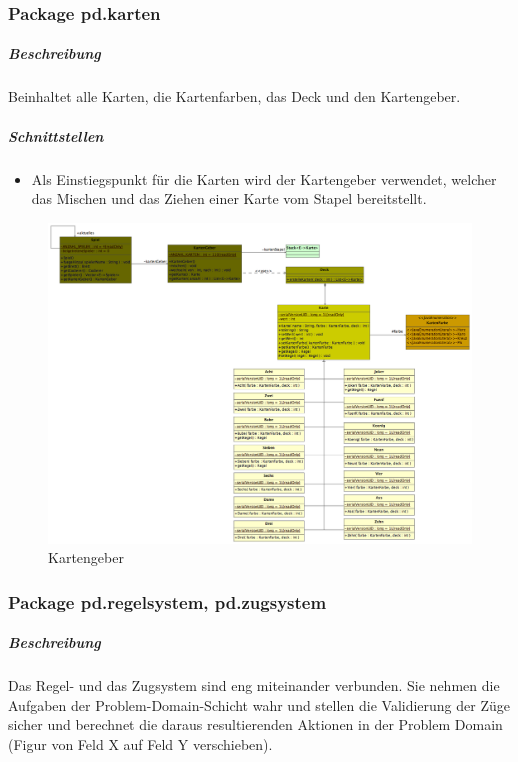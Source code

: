\documentclass[12pt,halfparskip]{scrartcl}
\begin{document}
\clearpage
\subsubsection{Package pd.karten} %
\label{ssub:package_pd_karten}
\subparagraph{Beschreibung}
Beinhaltet alle Karten, die Kartenfarben, das Deck und den Kartengeber. 

\subparagraph{Schnittstellen} %
\label{ssub:schnittstellen}
\begin{itemize}
	\item Als Einstiegspunkt für die Karten wird der Kartengeber verwendet, welcher das Mischen und das Ziehen einer Karte vom Stapel bereitstellt.
\end{itemize}

\begin{figure}[h]
	\centering
	\includegraphics[width=\textwidth]{pd_kartengeber}
	\caption{Kartengeber}
	\label{fig:pd_kartengeber}
\end{figure}


\clearpage
\subsubsection{Package pd.regelsystem, pd.zugsystem} %
\label{ssub:package_pd_regelsystem}
\subparagraph{Beschreibung}
Das Regel- und das Zugsystem sind eng miteinander verbunden. Sie nehmen die Aufgaben der Problem-Domain-Schicht wahr und stellen die Validierung der Züge sicher und berechnet die daraus resultierenden Aktionen in der Problem Domain (Figur von Feld X auf Feld Y verschieben).
\end{document}
